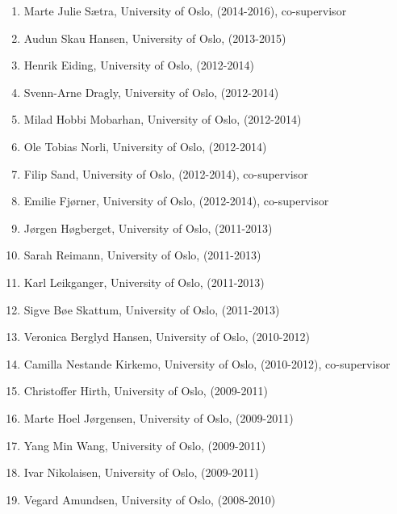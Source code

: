 \documentclass[%
oneside,                 %
final,                   %
10pt]{article}
\begin{document}
\begin{enumerate}
\item Marte Julie Sætra, University of Oslo, (2014-2016), co-supervisor

\item Audun Skau Hansen, University of Oslo, (2013-2015)

\item Henrik Eiding, University of Oslo, (2012-2014)

\item Svenn-Arne Dragly, University of Oslo, (2012-2014)

\item Milad Hobbi Mobarhan, University of Oslo, (2012-2014)

\item Ole Tobias Norli, University of Oslo, (2012-2014)

\item Filip Sand, University of Oslo, (2012-2014), co-supervisor

\item Emilie Fjørner, University of Oslo, (2012-2014), co-supervisor

\item Jørgen Høgberget, University of Oslo, (2011-2013)

\item Sarah Reimann, University of Oslo, (2011-2013)

\item Karl Leikganger, University of Oslo, (2011-2013)

\item Sigve Bøe Skattum, University of Oslo, (2011-2013)

\item Veronica Berglyd Hansen, University of Oslo, (2010-2012)

\item Camilla Nestande Kirkemo, University of Oslo, (2010-2012), co-supervisor

\item Christoffer Hirth, University of Oslo, (2009-2011)

\item Marte Hoel Jørgensen, University of Oslo, (2009-2011)

\item Yang Min Wang, University of Oslo, (2009-2011)

\item Ivar Nikolaisen, University of Oslo, (2009-2011)

\item Vegard Amundsen, University of Oslo, (2008-2010)


\end{enumerate}
\end{document}
